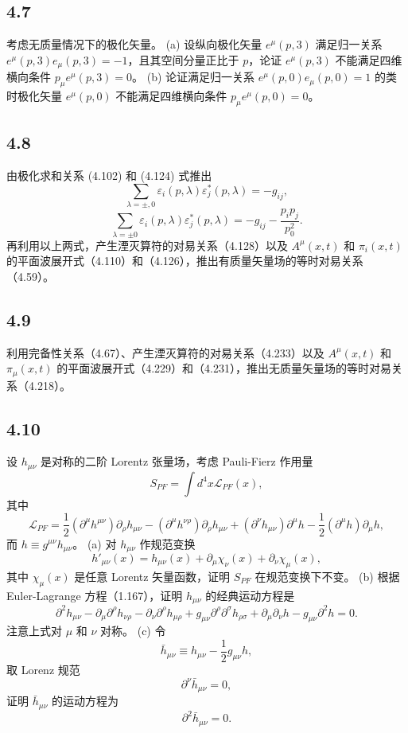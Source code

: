 \newpage
\subsection{4.7}
考虑无质量情况下的极化矢量。
(a) 设纵向极化矢量 $e^\mu(p,3)$ 满足归一关系 $e^\mu(p,3)e_\mu(p,3) = -1$，且其空间分量正比于 $p$，论证 $e^\mu(p,3)$ 不能满足四维横向条件 $p_\mu e^\mu(p,3) = 0$。
(b) 论证满足归一关系 $e^\mu(p,0)e_\mu(p,0) = 1$ 的类时极化矢量 $e^\mu(p,0)$ 不能满足四维横向条件 $p_\mu e^\mu(p,0) = 0$。

\newpage
\subsection{4.8}
由极化求和关系 (4.102) 和 (4.124) 式推出
$$\sum_{\lambda=\pm,0} \varepsilon_i(p,\lambda)\varepsilon_j^\ast(p,\lambda) = -g_{ij},$$
$$\sum_{\lambda = \pm 0} \varepsilon_i (p, \lambda) \varepsilon_j^* (p, \lambda) = -g_{ij} - \frac{p_ip_j}{p_0^2}.$$
再利用以上两式，产生湮灭算符的对易关系（4.128）以及 $A^\mu (x, t)$ 和 $\pi_i (x, t)$ 的平面波展开式（4.110）和（4.126），推出有质量矢量场的等时对易关系（4.59）。

\newpage
\subsection{4.9}
利用完备性关系（4.67）、产生湮灭算符的对易关系（4.233）以及 $A^\mu (x, t)$ 和 $\pi_\mu (x, t)$ 的平面波展开式（4.229）和（4.231），推出无质量矢量场的等时对易关系（4.218）。

\newpage
\subsection{4.10}
设 $h_{\mu \nu}$ 是对称的二阶 Lorentz 张量场，考虑 Pauli-Fierz 作用量
$$S_{PF} = \int d^4 x \mathcal{L}_{PF}(x),$$
其中
$$\mathcal{L}_{PF} = \frac{1}{2} (\partial^\mu h^{\mu \nu}) \partial_\rho h_{\mu \nu} - (\partial^\mu h^{\nu \rho}) \partial_\rho h_{\mu \nu} + (\partial^\nu h_{\mu \nu}) \partial^\mu h - \frac{1}{2} (\partial^\mu h) \partial_\mu h,$$
而 $h \equiv g^{\mu \nu} h_{\mu \nu}$。
(a) 对 $h_{\mu \nu}$ 作规范变换
$$h'_{\mu \nu} (x) = h_{\mu \nu} (x) + \partial_\mu \chi_\nu (x) + \partial_\nu \chi_\mu (x),$$
其中 $\chi_\mu (x)$ 是任意 Lorentz 矢量函数，证明 $S_{PF}$ 在规范变换下不变。
(b) 根据 Euler-Lagrange 方程（1.167），证明 $h_{\mu \nu}$ 的经典运动方程是
$$\partial^2 h_{\mu \nu} - \partial_\mu \partial^\rho h_{\nu \rho} - \partial_\nu \partial^\rho h_{\mu \rho} + g_{\mu \nu} \partial^\rho \partial^\sigma h_{\rho \sigma} + \partial_\mu \partial_\nu h - g_{\mu \nu} \partial^2 h = 0.$$
注意上式对 $\mu$ 和 $\nu$ 对称。
(c) 令
$$\bar{h}_{\mu \nu} \equiv h_{\mu \nu} - \frac{1}{2} g_{\mu \nu} h,$$
取 Lorenz 规范
$$\partial^\nu \bar{h}_{\mu \nu} = 0,$$
证明 $\bar{h}_{\mu \nu}$ 的运动方程为
$$\partial^2 \bar{h}_{\mu \nu} = 0.$$



